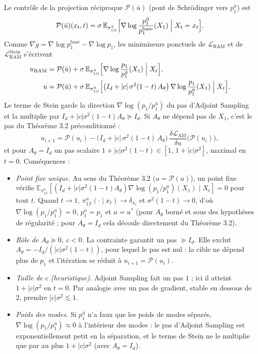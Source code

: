 \documentclass[11pt]{article}
\newcommand{\E}{\mathbb{E}}
\newcommand{\Id}{I_d}
\newcommand{\ubar}{\bar u}
\newcommand{\pbase}{p^{\mathrm{base}}}
\begin{document}
Le contrôle de la projection réciproque $\mathcal{P}(\ubar)$ (pont de Schrödinger vers $p_1^{\ubar}$) est
\begin{equation}
\mathcal{P}(\ubar)(x_t,t) = \sigma\, \E_{\pi^{\ubar}_{1|t}}\Bigl[ \nabla \log \frac{p_1^{\ubar}}{\pbase_1}(X_1) \;\Big|\; X_t = x_t \Bigr].
\end{equation}
Comme $\nabla g = \nabla \log \pbase_1 - \nabla \log p_1$, les minimiseurs ponctuels de $\mathcal{L}_{\mathrm{RAM}}$ et de $\mathcal{L}_{\mathrm{RAM}}^{\mathrm{Stein}}$ s'écrivent
\begin{align}
u_{\mathrm{RAM}} &= \mathcal{P}(\ubar) + \sigma\, \E_{\pi^{\ubar}_{1|t}}\Bigl[ \nabla \log \frac{p_1}{p_1^{\ubar}}(X_1) \;\Big|\; X_t \Bigr], \\
u &= \mathcal{P}(\ubar) + \sigma\, \E_{\pi^{\ubar}_{1|t}}\Bigl[ \bigl( \Id + |c|\, \sigma^2 (1-t)\, A_\theta \bigr)\, \nabla \log \frac{p_1}{p_1^{\ubar}}(X_1) \;\Big|\; X_t \Bigr].
\end{align}
Le terme de Stein garde la direction $\nabla \log (p_1 / p_1^{\ubar})$ du pas d'Adjoint Sampling et la multiplie par $\Id + |c|\sigma^2(1-t) A_\theta \succeq \Id$. Si $A_\theta$ ne dépend pas de $X_1$, c'est le pas du Théorème 3.2 préconditionné :
\begin{equation}
u_{i+1} = \mathcal{P}(u_i) - \bigl( \Id + |c|\, \sigma^2 (1-t)\, A_\theta \bigr)\, \frac{\delta \mathcal{L}_{\mathrm{AM}}}{\delta u}\bigl(\mathcal{P}(u_i)\bigr),
\end{equation}
et pour $A_\theta = \Id$ un pas scalaire $1 + |c|\sigma^2(1-t) \in [1,\, 1 + |c|\sigma^2]$, maximal en $t = 0$. Conséquences :
\begin{itemize}
\item \emph{Point fixe unique.} Au sens du Théorème 3.2 ($u = \mathcal{P}(u)$), un point fixe vérifie $\E_{\pi^{u}_{1|t}}[(\Id + |c|\sigma^2(1-t)A_\theta)\nabla \log (p_1/p_1^{u})(X_1) \mid X_t] = 0$ pour tout $t$. Quand $t \to 1$, $\pi^{u}_{1|t}(\cdot \mid x_t) \to \delta_{x_t}$ et $\sigma^2(1-t) \to 0$, d'où $\nabla \log (p_1/p_1^{u}) = 0$, $p_1^{u} = p_1$ et $u = u^*$ (pour $A_\theta$ borné et sous des hypothèses de régularité ; pour $A_\theta = \Id$ cela découle directement du Théorème 3.2).
\item \emph{Rôle de $A_\theta \succeq 0$, $c < 0$.} La contrainte garantit un pas $\succeq \Id$. Elle exclut $A_\theta = -\Id / (|c|\sigma^2(1-t))$, pour lequel le pas est nul : la cible ne dépend plus de $p_1$ et l'itération se réduit à $u_{i+1} = \mathcal{P}(u_i)$.
\item \emph{Taille de $c$ (heuristique).} Adjoint Sampling fait un pas $1$ ; ici il atteint $1 + |c|\sigma^2$ en $t = 0$. Par analogie avec un pas de gradient, stable en dessous de $2$, prendre $|c|\sigma^2 \lesssim 1$.
\item \emph{Poids des modes.} Si $p_1^{\ubar}$ n'a faux que les poids de modes séparés, $\nabla \log (p_1/p_1^{\ubar}) \approx 0$ à l'intérieur des modes : le pas d'Adjoint Sampling est exponentiellement petit en la séparation, et le terme de Stein ne le multiplie que par au plus $1 + |c|\sigma^2$ (avec $A_\theta = \Id$).
\end{itemize}
\end{document}

